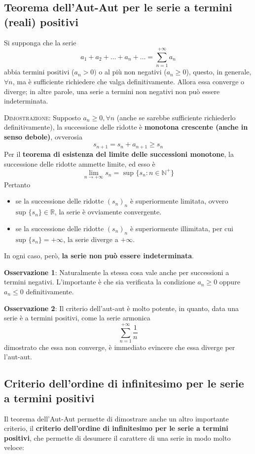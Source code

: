 \documentclass[a4paper]{extarticle}
\begin{document}
\vspace{1em}
\noindent
\subsection{Teorema dell'Aut-Aut per le serie a termini (reali) positivi}
Si supponga che la serie
\[a_1+a_2+\dots+a_n+\dots=\sum_{n=1}^{+\infty} a_n\]
abbia termini positivi ($a_n > 0)$ o al più non negativi ($a_n \geq 0$), questo, in generale, $\forall n$, ma è sufficiente richiedere che valga definitivamente. Allora essa converge o diverge; in altre parole, una serie a termini non negativi non può essere indeterminata.

\vspace{2em}
\noindent
\normalfont \normalsize
\textsc{Dimostrazione}: Supposto $a_n \geq 0, \forall n$ (anche se sarebbe sufficiente richiederlo definitivamente), la successione delle ridotte è \textbf{monotona crescente (anche in senso debole)}, ovverosia
\[s_{n+1}=s_n+a_{n+1} \geq s_n\]
Per il \textbf{teorema di esistenza del limite delle successioni monotone}, la successione delle ridotte ammette limite, ed esso è
\[\lim_{n \to +\infty} s_n = \text{ sup } \{s_n : n \in \mathbb{N}^+\}\]
Pertanto
\begin{itemize}
    \item se la successione delle ridotte $(s_n)_n$ è superiormente limitata, ovvero $\text{sup } \{s_n\} \in \mathbb{R}$, la serie è ovviamente convergente.
    \item se la successione delle ridotte $(s_n)_n$ è superiormente illimitata, per cui $\text{sup } \{s_n\} = +\infty$, la serie diverge a $+\infty$.
\end{itemize}
In ogni caso, però, \textbf{la serie non può essere indeterminata}.

\vspace{1em}
\noindent
\textbf{Osservazione 1}: Naturalmente la stessa cosa vale anche per successioni a termini negativi. L'importante è che sia verificata la condizione $a_n \geq 0$ oppure $a_n \leq 0$ definitivamente.

\vspace{1em}
\noindent
\textbf{Osservazione 2}: Il criterio dell'aut-aut è molto potente, in quanto, data una serie è a termini positivi, come la serie armonica
\[\sum_{n=1}^{+\infty} \frac{1}{n}\]
dimostrato che essa non converge, è immediato evincere che essa diverge per l'aut-aut.

\vspace{1em}
\noindent
\subsection{Criterio dell'ordine di infinitesimo per le serie a termini positivi}
Il teorema dell'Aut-Aut permette di dimostrare anche un altro importante criterio, il \textbf{criterio dell'ordine di infinitesimo per le serie a termini positivi}, che permette di desumere il carattere di una serie in modo molto veloce:
\end{document}
